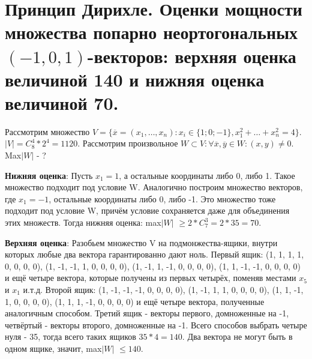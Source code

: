 \section{Принцип Дирихле. Оценки мощности множества попарно неортогональных $(-1, 0, 1)$-векторов: верхняя оценка величиной 140 и нижняя оценка величиной 70.}
Рассмотрим множество $V = \{ \overline{x} = (x_1, \dots, x_n) : x_i \in \{1; 0; -1 \}, x_1^2 + \dots + x_n^2 = 4\}$. $|V| = C_8^4*2^4 = 1120$. Рассмотрим произвольное $W \subset V: \forall \overline{x}, \overline{y} \in W: (x, y) \neq 0$. Max$|W|$ - ? \\ \par
\textbf{Нижняя оценка}: Пусть $x_1 = 1$, а остальные координаты либо 0, либо 1. Такое множество подходит под условие W. Аналогично построим множество векторов, где $x_1 = -1$, остальные координаты либо 0, либо -1. Это множество тоже подходит под условие W, причём условие сохраняется даже для объединения этих множеств. Тогда нижняя оценка: max$|W|$ $\geqslant 2*C_7^3 = 2*35 = 70$. \\ \par
\textbf{Верхняя оценка}: Разобьем множество V на подмонжества-ящики, внутри которых любые два вектора гарантированно дают ноль. Первый ящик: (1, 1, 1, 1, 0, 0, 0, 0), (1, -1, -1, 1, 0, 0, 0, 0), (1, -1, 1, -1, 0, 0, 0, 0), (1, 1, -1, -1, 0, 0, 0, 0) и ещё четыре вектора, которые получены из первых четырёх, поменяв местами $x_5$ и $x_1$ и.т.д. Второй ящик: (1, -1, -1, -1, 0, 0, 0, 0), (1, -1, 1, 1, 0, 0, 0, 0), (1, 1, -1, 1, 0, 0, 0, 0), (1, 1, 1, -1, 0, 0, 0, 0) и ещё четыре вектора, полученные аналогичным способом. Третий ящик - векторы первого, домноженные на -1, четвёртый - векторы второго, домноженные на -1. Всего способов выбрать четыре нуля - 35, тогда всего таких ящиков $35*4 = 140$. Два вектора не могут быть в одном ящике, значит, max$|W|$ $\leqslant 140$.